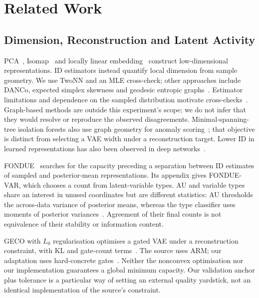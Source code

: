 \documentclass[make,article,submit,pdftex,moreauthors]{Definitions/mdpi}
\begin{document}
\section{Related Work}\label{sec:related}

\subsection{Dimension, Reconstruction and Latent Activity}
PCA~\cite{tippingbishop1999ppca}, Isomap~\cite{tenenbaum2000isomap} and
locally linear embedding~\cite{roweis2000lle} construct low-dimensional
representations. ID estimators instead quantify local dimension from
sample geometry. We use TwoNN and an MLE cross-check; other approaches
include DANCo, expected simplex skewness and geodesic entropic
graphs~\cite{ceruti2014danco,johnsson2015ess,costa2004geodesic}.
Estimator limitations and dependence on the sampled distribution motivate
cross-checks~\cite{camastra2016intrinsic,allegra2020data}.
Graph-based methods are outside this experiment's scope; we do not infer
that they would resolve or reproduce the observed disagreements.
Minimal-spanning-tree isolation forests also use graph geometry for
anomaly scoring~\cite{galka2022isolation}; that objective is distinct from
selecting a VAE width under a reconstruction target.
Lower ID in learned representations has also been observed in deep
networks~\cite{ansuini2019intrinsic,pope2021intrinsic}.

FONDUE~\cite{bonheme2022fondue} searches for the capacity preceding a
separation between ID estimates of sampled and posterior-mean
representations. Its appendix gives FONDUE-VAR, which chooses a count from
latent-variable types. AU and variable types share an interest in unused
coordinates but are different statistics: AU thresholds the across-data
variance of posterior means, whereas the type classifier uses moments of
posterior variances~\cite{bonheme2023active}. Agreement of their final
counts is not equivalence of their stability or information content.

GECO with $L_0$ regularisation optimises a gated VAE under a reconstruction
constraint, with KL and gate-count terms~\cite{deboom2020geco,rezende2018geco}.
The source uses ARM; our adaptation uses hard-concrete
gates~\cite{louizos2018l0}. Neither the nonconvex optimisation nor our
implementation guarantees a global minimum capacity. Our validation
anchor plus tolerance is a particular way of setting an external quality
yardstick, not an identical implementation of the source's constraint.
\end{document}
